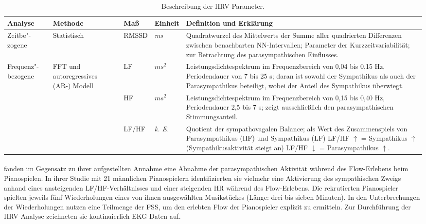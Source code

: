 \begin{table}
	[!htb] \caption[Beschreibung der \ac{HRV}-Parameter.]{Beschreibung der \ac{HRV}-Parameter.} \label{tab:beschreibung_der_hrv_parameter} 
	\begin{tabularx}
		{ 
		\textwidth}{p{} p{} p{} p{} X} \toprule Analyse & Methode & Maß & Einheit & Definition und Erklärung \\
		\midrule Zeitbe"-zogene & Statistisch & \acs{RMSSD} & \emph{ms} & Quadratwurzel des Mittelwerts der Summe aller quadrierten Differenzen zwischen benachbarten NN-Intervallen; Parameter der Kurzzeitvariabilität; zur Betrachtung des parasympathischen Einflusses. \\
		\hline
		
		Frequenz"-bezogene & \acs{FFT} und autoregressives (AR-) Modell & \acs{LF} & $ms^{2}$ & Leistungsdichtespektrum im Frequenzbereich von 0,04 bis 0,15 Hz, Periodendauer von 7 bis 25 s; daran ist sowohl der Sympathikus als auch der Parasympathikus beteiligt, wobei der Anteil des Sympathikus überwiegt. \\
		\cline{3-5}
		
		& & \acs{HF} & $ms^{2}$ & Leistungsdichtespektrum im Frequenzbereich von 0,15 bis 0,40 Hz, Periodendauer 2,5 bis 7 s; zeigt ausschließlich den parasympathischen Stimmungsanteil. \\
		\cline{3-5}
		
		& & \acs{LF}/\acs{HF} & \emph{k. E.} & Quotient der sympathovagalen Balance; als Wert des Zusammenspiels von Parasympathikus (\acs{HF}) und Sympathikus (\acs{LF}) \acs{LF}/\acs{HF} $\uparrow{}$ = Sympathikus $\uparrow{}$ (Sympathikusaktivität steigt an) \acs{LF}/\acs{HF} $\downarrow{}$ = Parasympathikus $\uparrow{}$. \\
		\bottomrule 
	\end{tabularx}
\end{table}

\paragraph{\citet{deManzano2010}} 

\label{par:demanzano2010}

\citet{deManzano2010} fanden im Gegensatz zu ihrer aufgestellten Annahme eine Abnahme der parasympathischen Aktivität während des Flow-Erlebens beim Pianospielen. In ihrer Studie mit 21 männlichen Pianospielern identifizierten sie vielmehr eine Aktivierung des sympathischen Zweigs anhand eines ansteigenden \acs{LF}/\acs{HF}-Verhältnisses und einer steigenden HR während des Flow-Erlebens. Die rekrutierten Pianospieler spielten jeweils fünf Wiederholungen eines von ihnen ausgewählten Musikstückes (Länge: drei bis sieben Minuten). In den Unterbrechungen der Wiederholungen nutzen \citet{deManzano2010} eine Teilmenge der \ac{FSS}, um den erlebten Flow der Pianospieler explizit zu ermitteln. Zur Durchführung der \ac{HRV}-Analyse zeichneten sie kontinuierlich \ac{EKG}-Daten auf.

